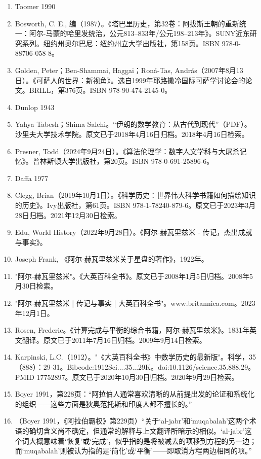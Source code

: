 \begin{enumerate}
\item Toomer 1990  
\item Bosworth, C. E., 编（1987）。《塔巴里历史，第32卷：阿拔斯王朝的重新统一：阿尔-马蒙的哈里发统治，公元813–833年/公元198–213年》。SUNY近东研究系列。纽约州奥尔巴尼：纽约州立大学出版社，第158页。ISBN 978-0-88706-058-8。  
\item Golden, Peter；Ben-Shammai, Haggai；Roná-Tas, András（2007年8月13日）。《可萨人的世界：新视角》。选自1999年耶路撒冷国际可萨学讨论会的论文。BRILL，第376页。ISBN 978-90-474-2145-0。  
\item Dunlop 1943  
\item Yahya Tabesh；Shima Salehi。“伊朗的数学教育：从古代到现代”（PDF）。沙里夫大学技术学院。原文已于2018年4月16日归档。2018年4月16日检索。  
\item Presner, Todd（2024年9月24日）。《算法伦理学：数字人文学科与大屠杀记忆》。普林斯顿大学出版社，第20页。ISBN 978-0-691-25896-6。  
\item Daffa 1977  
\item Clegg, Brian（2019年10月1日）。《科学历史：世界伟大科学书籍如何描绘知识的历史》。Ivy出版社，第61页。ISBN 978-1-78240-879-6。原文已于2023年3月28日归档。2021年12月30日检索。  
\item Edu, World History（2022年9月28日）。《阿尔-赫瓦里兹米 - 传记，杰出成就与事实》。
\item Joseph Frank, 《阿尔-赫瓦里兹米关于星盘的著作》，1922年。  
\item "阿尔-赫瓦里兹米"。《大英百科全书》。原文已于2008年1月5日归档。2008年5月30日检索。  
\item "阿尔-赫瓦里兹米 | 传记与事实 | 大英百科全书"。www.britannica.com。2023年12月1日。  
\item Rosen, Frederic。《计算完成与平衡的综合书籍，阿尔-赫瓦里兹米》。1831年英文翻译。原文已于2011年7月16日归档。2009年9月14日检索。  
\item Karpinski, L.C.（1912）。"《大英百科全书》中数学历史的最新版"。科学，35（888）：29-31。Bibcode:1912Sci....35...29K。doi:10.1126/science.35.888.29。PMID 17752897。原文已于2020年10月30日归档。2020年9月29日检索。  
\item Boyer 1991，第228页：“阿拉伯人通常喜欢清晰的从前提出发的论证和系统化的组织——这些方面是狄奥范托斯和印度人都不擅长的。”  
\item （Boyer 1991，《阿拉伯霸权》第229页）“关于‘al-jabr’和‘muqabalah’这两个术语的确切含义尚不确定，但通常的解释与上文翻译所暗示的相似。‘al-jabr’这个词大概意味着‘恢复’或‘完成’，似乎指的是将被减去的项移到方程的另一边；而‘muqabalah’则被认为指的是‘简化’或‘平衡’——即取消方程两边相同的项。”  

\end{enumerate}
